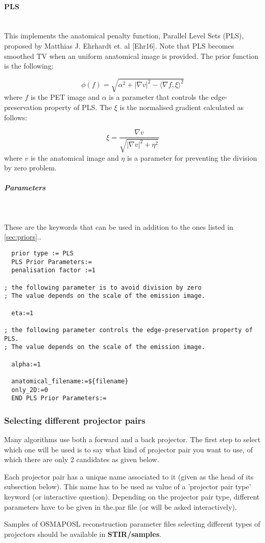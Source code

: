 \documentclass{article}
\newcommand{\subsubsubsection}[1]{\paragraph{#1}\mbox{} \\}
\newcommand{\subsubsubsubsection}[1]{\subparagraph{#1} \mbox{} \\}
\begin{document}
{{ \subsubsubsection{PLS}
This implements the  anatomical penalty function, Parallel Level Sets (PLS),  proposed by Matthias J. Ehrhardt et. al [Ehr16]. Note that
  PLS becomes smoothed TV when an uniform anatomical image is provided.  The prior function is the following:

  \[
  \phi(f) = \sqrt{\alpha^2 + |\nabla v|^2 - {\langle\nabla f,\xi\rangle}^2}
  \]
  where $ f $ is the PET image and $ \alpha $ is a parameter that controls the edge-preservation property of PLS.  The $ \xi $ is the normalised gradient calculated as follows:

  \[
  \xi = \frac{\nabla v}{\sqrt{|\nabla v|^2 + \eta^2}}
  \]
where $ v $ is the anatomical image and $ \eta $ is a parameter for preventing the division by zero problem.
}
{ \subsubsubsubsection{Parameters}
}
  These are the keywords that can be used in addition to the ones listed in \ref{sec:priors}..
  \begin{verbatim}
  prior type := PLS
  PLS Prior Parameters:=
  penalisation factor :=1

; the following parameter is to avoid division by zero
; The value depends on the scale of the emission image. 

  eta:=1

; the following parameter controls the edge-preservation property of PLS. 
; The value depends on the scale of the emission image. 

  alpha:=1

  anatomical_filename:=${filename}
  only_2D:=0
  END PLS Prior Parameters:=
  \end{verbatim}
\subsubsection{
Selecting different projector pairs}
\label{sec:projectorpairs}
Many algorithms use both a forward and a back projector. The 
first step to select which one will be used is to say what kind 
of projector pair you want to use, of which there are only 2 
candidates as given below. 


Each projector pair has a unique name associated to it (given 
as the head of its subsection below). This name has to be used 
as value of a 'projector pair type' keyword (or interactive question). 
Depending on the projector pair type, different parameters have 
to be given in the.par file (or will be asked interactively).


Samples of OSMAPOSL reconstruction parameter files selecting 
different types of projectors should be available in \textbf{STIR/samples}.

}
\end{document}
